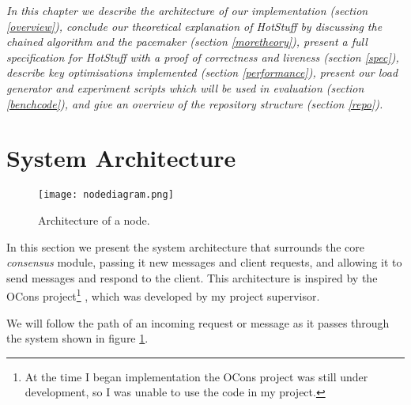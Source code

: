 \textit{In this chapter we describe the architecture of our implementation (section \ref{overview}), conclude our theoretical explanation of HotStuff by discussing the chained algorithm and the pacemaker (section \ref{moretheory}), present a full specification for HotStuff with a proof of correctness and liveness (section \ref{spec}), describe key optimisations implemented (section \ref{performance}), present our load generator and experiment scripts which will be used in evaluation (section \ref{benchcode}), and give an overview of the repository structure (section \ref{repo}).}

\section{System Architecture} \label{architecture}

\begin{figure}[h!]
\centering
\texttt{[image: nodediagram.png]}
\caption{Architecture of a node.}
\label{nodediagram}
\end{figure}

In this section we present the system architecture that surrounds the core \textit{consensus} module, passing it new messages and client requests, and allowing it to send messages and respond to the client. This architecture is inspired by the OCons project\footnote{At the time I began implementation the OCons project was still under development, so I was unable to use the code in my project.} \cite{jensen_ocons_2023}, which was developed by my project supervisor.

We will follow the path of an incoming request or message as it passes through the system shown in figure \ref{nodediagram}.

